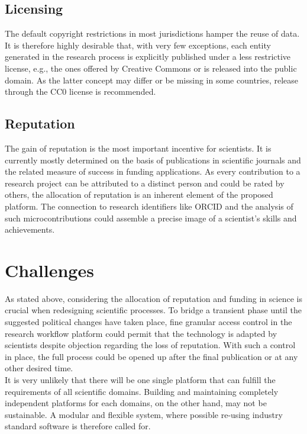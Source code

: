 \documentclass{llncs}
\begin{document}
\subsection{Licensing}

The default copyright restrictions in most jurisdictions hamper the
reuse of data. It is therefore highly desirable that, with very few
exceptions, each entity generated in the research process is
explicitly published under a less restrictive license, e.g., the ones
offered by Creative Commons \cite{CC} or is released into the public
domain. As the latter concept may differ or be missing in some
countries, release through the CC0 license \cite {CC0} is
recommended.

\subsection{Reputation}

The gain of reputation is the most important incentive for
scientists. It is currently mostly determined on the basis of
publications in scientific journals and the related measure of success
in funding applications. As every contribution to a research project
can be attributed to a distinct person and could be rated by others,
the allocation of reputation is an inherent element of the proposed
platform. The connection to research identifiers like ORCID
\cite{ORCID} and the analysis of such microcontributions could
assemble a precise image of a scientist's skills and achievements.

\section{Challenges}

As stated above, considering the allocation of reputation and funding
in science is crucial when redesigning scientific processes. To bridge
a transient phase until the suggested political changes have taken
place, fine granular access control in the research workflow platform
could permit that the technology is adapted by scientists despite
objection regarding the loss of reputation. With such a control in
place, the full process could be opened up after the final publication
or at any other desired time.\\

It is very unlikely that there will be one single platform that can
fulfill the requirements of all scientific domains. Building and
maintaining completely independent platforms for each domains, on the
other hand, may not be sustainable. A modular and flexible system,
where possible re-using industry standard software is therefore called
for.\\
\end{document}
